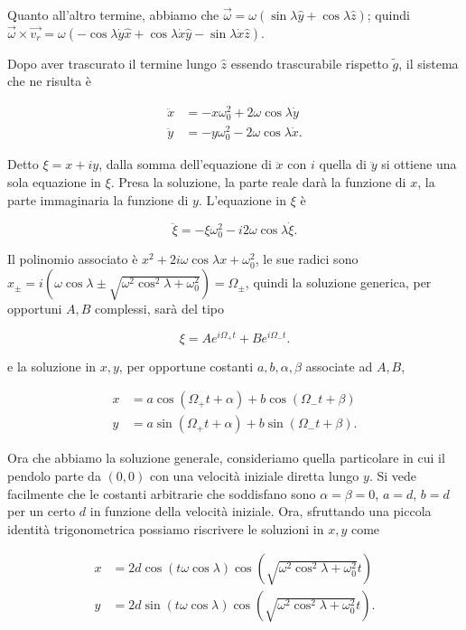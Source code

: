 \documentclass[../main.tex]{subfiles}
\begin{document}
Quanto all'altro termine, abbiamo che $\vec{\omega}=\omega (\sin \lambda \hat{y} + \cos \lambda \hat{z})$; quindi
$\vec{\omega}\times\vec{v_r} = \omega (-\cos \lambda \dot{y}\hat{x} + \cos \lambda \dot{x}\hat{y} - \sin \lambda \dot{x} \hat{z})$.

Dopo aver trascurato il termine lungo $\hat{z}$ essendo trascurabile rispetto $\tilde{g}$, il sistema che ne risulta è

\begin{align*}
	\ddot{x} &=  -x\omega^2_0 +2\omega\cos \lambda \dot{y}\\
	\ddot{y} &=  -y\omega^2_0 -2\omega\cos \lambda \dot{x}.
\end{align*}

Detto $\xi = x + iy$, dalla somma dell'equazione di $\ddot{x}$ con $i$ quella di $\ddot{y}$ si ottiene una sola equazione in $\xi$.
Presa la soluzione, la parte reale darà la funzione di $x$, la parte immaginaria la funzione di $y$.
L'equazione in $\xi$ è

\begin{equation}
 \label{pf:xieq}
  \ddot{\xi} = -\xi \omega^2_0 - i 2\omega\cos \lambda \dot{\xi}.
\end{equation}

Il polinomio associato è $x^2 + 2i\omega\cos\lambda x + \omega^2_0$, le sue radici sono
$ x_{\pm} = i\left(\omega\cos\lambda \pm \sqrt{\omega^2\cos^2 \lambda + \omega^2_0} \right) = \Omega_{\pm}$,
quindi la soluzione generica, per opportuni $A,B$ complessi, sarà del tipo

\[
  \xi = Ae^{i\Omega_+ t} + Be^{i\Omega_-t}.
\]

e la soluzione in $x,y$, per opportune costanti $a,b,\alpha,\beta$ associate ad $A,B$,

\begin{align*}
	x &=  a\cos(\Omega_+ t + \alpha) + b\cos(\Omega_- t + \beta)\\
	y &=  a\sin(\Omega_+ t + \alpha) + b\sin(\Omega_- t + \beta).
\end{align*}

Ora che abbiamo la soluzione generale, consideriamo quella particolare in cui il pendolo parte da $(0,0)$ con una velocità iniziale diretta
lungo $y$. Si vede facilmente che le costanti arbitrarie che soddisfano sono $\alpha=\beta=0$, $a=d$, $b=d$
per un certo $d$ in funzione della velocità iniziale.
Ora, sfruttando una piccola identità trigonometrica possiamo riscrivere le soluzioni in $x,y$ come

\begin{align*}
	x &=  2d\cos(t \omega\cos\lambda)\cos\left(\sqrt{\omega^2\cos^2 \lambda + \omega^2_0} t\right)\\
	y &=  2d\sin(t \omega\cos\lambda)\cos\left(\sqrt{\omega^2\cos^2 \lambda + \omega^2_0} t\right).
\end{align*}
\end{document}
